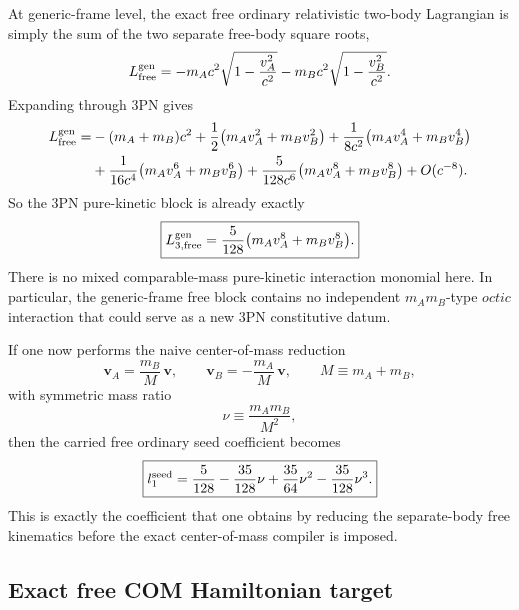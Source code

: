 \documentclass[11pt]{article}
\begin{document}
At generic-frame level, the exact free ordinary relativistic two-body Lagrangian
is simply the sum of the two separate free-body square roots,
\begin{equation}
L_{\rm free}^{\rm gen}
=
-m_Ac^2\sqrt{1-\frac{v_A^2}{c^2}}
-
 m_Bc^2\sqrt{1-\frac{v_B^2}{c^2}}.
\label{eq:kinetic-free-gen-exact}
\end{equation}
Expanding through $3$PN gives
\begin{equation}
\begin{aligned}
L_{\rm free}^{\rm gen}
=
&-(m_A+m_B)c^2
+\frac12\bigl(m_Av_A^2+m_Bv_B^2\bigr)
+\frac{1}{8c^2}\bigl(m_Av_A^4+m_Bv_B^4\bigr)
\\
&+\frac{1}{16c^4}\bigl(m_Av_A^6+m_Bv_B^6\bigr)
+\frac{5}{128c^6}\bigl(m_Av_A^8+m_Bv_B^8\bigr)
+O(c^{-8}).
\end{aligned}
\label{eq:kinetic-free-gen-series}
\end{equation}
So the $3$PN pure-kinetic block is already exactly
\begin{equation}
\boxed{
L_{3,\rm free}^{\rm gen}
=
\frac{5}{128}\bigl(m_Av_A^8+m_Bv_B^8\bigr).
}
\label{eq:kinetic-free-gen-3pn}
\end{equation}
There is no mixed comparable-mass pure-kinetic interaction monomial here.  In
particular, the generic-frame free block contains no independent $m_Am_B$-type
$octic$ interaction that could serve as a new $3$PN constitutive datum.

If one now performs the naive center-of-mass reduction
\begin{equation}
\mathbf v_A=\frac{m_B}{M}\,\mathbf v,
\qquad
\mathbf v_B=-\frac{m_A}{M}\,\mathbf v,
\qquad
M\equiv m_A+m_B,
\label{eq:kinetic-com-velocities}
\end{equation}
with symmetric mass ratio
\begin{equation}
\nu\equiv \frac{m_Am_B}{M^2},
\label{eq:kinetic-nu-def}
\end{equation}
then the carried free ordinary seed coefficient becomes
\begin{equation}
\boxed{
 l_1^{\rm seed}
 =
 \frac{5}{128}-\frac{35}{128}\nu+\frac{35}{64}\nu^2-\frac{35}{128}\nu^3.
}
\label{eq:kinetic-l1-seed}
\end{equation}
This is exactly the coefficient that one obtains by reducing the separate-body
free kinematics before the exact center-of-mass compiler is imposed.

\subsection{Exact free COM Hamiltonian target}
\label{sec:kinetic-com-target}
\end{document}
